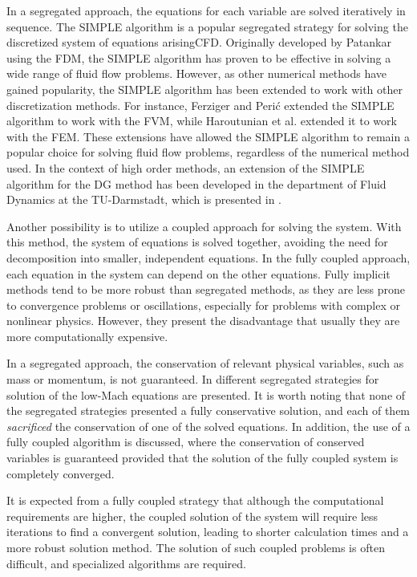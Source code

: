 In a segregated approach, the equations for each variable are solved iteratively in sequence. The \gls{SIMPLE} algorithm is a popular segregated strategy for solving the discretized system of equations arising\gls{CFD}. Originally developed by Patankar \parencite{patankarNumericalHeatTransfer1980} using the \gls{FDM}, the SIMPLE algorithm has proven to be effective in solving a wide range of fluid flow problems. However, as other numerical methods have gained popularity, the SIMPLE algorithm has been extended to work with other discretization methods. For instance, Ferziger and Perić \parencite{ferzigerComputationalMethodsFluid2002} extended the SIMPLE algorithm to work with the \gls{FVM}, while Haroutunian et al. \parencite{haroutunianSegregatedFiniteElement1993} extended it to work with the \gls{FEM}. These extensions have allowed the SIMPLE algorithm to remain a popular choice for solving fluid flow problems, regardless of the numerical method used. In the context of high order methods, an extension of the SIMPLE algorithm for the DG method has been developed in the department of Fluid Dynamics at the TU-Darmstadt, which is presented in \textcite{kleinHighorderDiscontinuousGalerkin2015}. 

Another possibility is to utilize a coupled approach for solving the system. With this method, the system of equations is solved together, avoiding the need for decomposition into smaller, independent equations. In the fully coupled approach, each equation in the system can depend on the other equations. Fully implicit methods tend to be more robust than segregated methods, as they are less prone to convergence problems or oscillations, especially for problems with complex or nonlinear physics. However, they present the disadvantage that usually they are more computationally expensive.

In a segregated approach, the conservation of relevant physical variables, such as mass or momentum, is not guaranteed. In \textcite{knikkerComparativeStudyHighorder2011} different segregated strategies for solution of the low-Mach equations are presented.  It is worth noting that none of the segregated strategies presented a fully conservative solution, and each of them \textit{sacrificed} the conservation of one of the solved equations. In addition, the use of a fully coupled algorithm is discussed, where the conservation of conserved variables is guaranteed provided that the solution of the fully coupled system is completely converged.

It is expected from a fully coupled strategy that although the computational requirements are higher, the coupled solution of the system will require less iterations to find a convergent solution, leading to shorter calculation times and a more robust solution method.  The solution of such coupled problems is often difficult, and specialized algorithms are required. 

